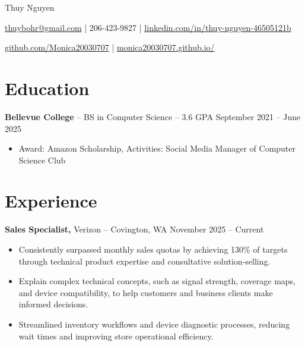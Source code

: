 \documentclass[11pt]{article}       %
\begin{document}
\centerline{\Huge Thuy Nguyen}

\vspace{5pt}

\centerline{\href{mailto:thuybohr@gmail.com}{thuybohr@gmail.com} | 206-423-9827 |
\href{https://www.linkedin.com/in/thuy-nguyen-46505121b/}{linkedin.com/in/thuy-nguyen-46505121b}}

\centerline{\href{https://github.com/Monica20030707}{github.com/Monica20030707} | 
\href{https://monica20030707.github.io/}{monica20030707.github.io/}} 

\vspace{-9pt}

\section*{Education}
\textbf{Bellevue College} -- BS in Computer Science -- 3.6 GPA \hfill September 2021 -- June 2025\\
\vspace{-9pt}
\begin{itemize}
  \item Award: Amazon Scholarship, Activities: Social Media Manager of Computer Science Club
\end{itemize}

\vspace{-18.5pt}

\section*{Experience}

\textbf{Sales Specialist,} {Verizon} -- Covington, WA \hfill November 2025 -- Current \\
\vspace{-9pt}
\begin{itemize}
  \item Consistently surpassed monthly sales quotas by achieving 130\% of targets through technical product expertise and consultative solution-selling.
  \item Explain complex technical concepts, such as signal strength, coverage maps, and device compatibility, to help customers and business clients make informed decisions.
  \item Streamlined inventory workflows and device diagnostic processes, reducing wait times and improving store operational efficiency.
\end{itemize}
\end{document}
